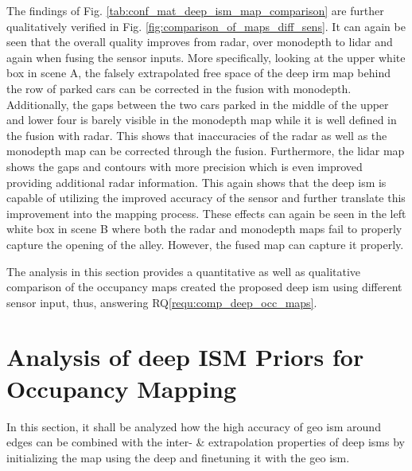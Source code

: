 The findings of Fig. \ref{tab:conf_mat_deep_ism_map_comparison} are further qualitatively verified in Fig. \ref{fig:comparison_of_maps_diff_sens}. It can again be seen that the overall quality improves from radar, over \gls{monodepth} to lidar and again when fusing the sensor inputs. More specifically, looking at the upper white box in scene A, the falsely extrapolated free space of the deep \gls{irm} map behind the row of parked cars can be corrected in the fusion with \gls{monodepth}. Additionally, the gaps between the two cars parked in the middle of the upper and lower four is barely visible in the \gls{monodepth} map while it is well defined in the fusion with radar. This shows that inaccuracies of the radar as well as the \gls{monodepth} map can be corrected through the fusion. Furthermore, the lidar map shows the gaps and contours with more precision which is even improved providing additional radar information. This again shows that the deep \gls{ism} is capable of utilizing the improved accuracy of the sensor and further translate this improvement into the mapping process. These effects can again be seen in the left white box in scene B where both the radar and \gls{monodepth} maps fail to properly capture the opening of the alley. However, the fused map can capture it properly.
\begin{center}
\end{center}
The analysis in this section provides a quantitative as well as qualitative comparison of the occupancy maps created the proposed deep \gls{ism} using different sensor input, thus, answering RQ\ref{requ:comp_deep_occ_maps}.
%
\section{Analysis of deep ISM Priors for Occupancy Mapping}
\label{sec:exp_analyze_prior_properties}
In this section, it shall be analyzed how the high accuracy of geo \gls{ism} around edges can be combined with the inter- \& extrapolation properties of deep \gls{ism}s by initializing the map using the deep and finetuning it with the geo \gls{ism}.
%
